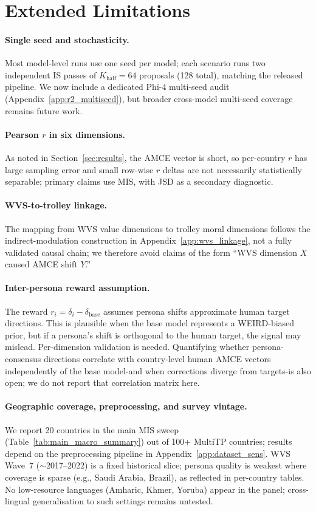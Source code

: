 \documentclass{article}
\begin{document}
\section{Extended Limitations}
\label{app:limitations}

\paragraph{Single seed and stochasticity.}
Most model-level runs use one seed per model; each scenario runs two independent
IS passes of $K_{\text{half}}{=}64$ proposals (128 total), matching the released
pipeline. We now include a dedicated Phi-4 multi-seed audit
(Appendix~\ref{app:r2_multiseed}), but broader cross-model multi-seed coverage
remains future work.

\paragraph{Pearson $r$ in six dimensions.}
As noted in Section~\ref{sec:results}, the AMCE vector is short, so per-country
$r$ has large sampling error and small row-wise $r$ deltas are not necessarily
statistically separable; primary claims use MIS, with JSD as a secondary diagnostic.

\paragraph{WVS-to-trolley linkage.}
The mapping from WVS value dimensions to trolley moral dimensions follows the
indirect-modulation construction in Appendix~\ref{app:wvs_linkage}, not a fully
validated causal chain; we therefore avoid claims of the form ``WVS dimension $X$
caused AMCE shift $Y$.''

\paragraph{Inter-persona reward assumption.}
The reward $r_i = \delta_i - \delta_{\text{base}}$ assumes persona shifts approximate
human target directions. This is plausible when the base model represents a WEIRD-biased
prior, but if a persona's shift is orthogonal to the human target, the signal may
mislead. Per-dimension validation is needed.
Quantifying whether persona-consensus directions correlate with country-level human
AMCE vectors independently of the base model-and when corrections diverge from
targets-is also open; we do not report that correlation matrix here.

\paragraph{Geographic coverage, preprocessing, and survey vintage.}
We report 20 countries in the main MIS sweep (Table~\ref{tab:main_macro_summary}) out of
100+ MultiTP countries; results depend on the preprocessing pipeline in
Appendix~\ref{app:dataset_sens}.
WVS Wave~7 ($\sim$2017--2022) is a fixed historical slice; persona quality is
weakest where coverage is sparse (e.g., Saudi Arabia, Brazil), as reflected in
per-country tables.
No low-resource languages (Amharic, Khmer, Yoruba) appear in the panel;
cross-lingual generalisation to such settings remains untested.
\end{document}
